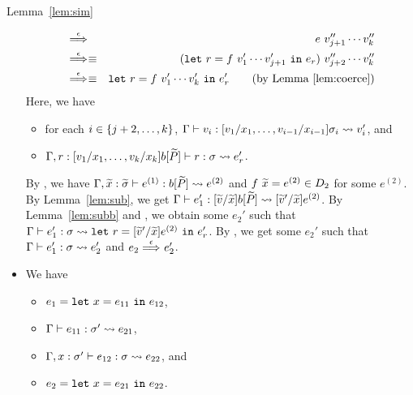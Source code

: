 \begin{pfof}{Lemma~\ref{lem:sim}}
\begin{itemize}
\begin{eqnarray*}
&\stackrel{\epsilon}{\Longrightarrow}_{}&e\ v_{j+1}''\cdots v_k'' \\
&\stackrel{\epsilon}{\Longrightarrow}_{}\equiv&(\mathtt{let~}r=f\ v_1'\cdots v_{j+1}'\mathtt{~in~}e_r)\ v_{j+2}''\cdots v_k'' \\
&\stackrel{\epsilon}{\Longrightarrow}_{}\equiv&\mathtt{let~}r=f\ v_1'\cdots v_k'\mathtt{~in~}e_r' \qquad (\mbox{by Lemma~\ref{lem:coerce}})
\end{eqnarray*}
Here, we have
\begin{itemize}
\item for each \(i \in \{j+2,\dots,k\}\), \(\Gamma \vdash v_i : [v_1/x_1,\dots,v_{i-1}/x_{i-1}]\sigma_i \leadsto v_i'\), and
\item \(\Gamma,r:[v_1/x_1,\dots,v_k/x_k]b[\widetilde{P}] \vdash r : \sigma \leadsto e_r'\).
\end{itemize}
%
By , we have
\(\Gamma,\widetilde{x}:\widetilde{\sigma} \vdash e^{(1)} : b[\widetilde{P}] \leadsto e^{(2)}\) and
\(f\ \widetilde{x}=e^{(2)} \in D_2\) for some \(e^{(2)}\).
%
By Lemma~\ref{lem:sub}, we get
\(\Gamma \vdash e_1' : [\widetilde{v}/\widetilde{x}]b[\widetilde{P}] \leadsto [\widetilde{v}'/\widetilde{x}]e^{(2)}\).
%
By Lemma~\ref{lem:subb} and , we obtain some \(e_2'\) such that
\(\Gamma \vdash e_1' : \sigma \leadsto \mathtt{let~}r=[\widetilde{v}'/\widetilde{x}]e^{(2)}\mathtt{~in~}{e_r'}\).
By , we get some \(e_2'\) such that
\(\Gamma \vdash e_1' : \sigma \leadsto e_2'\) and
\(e_2 \stackrel{\epsilon}{\Longrightarrow}_{} e_2'\).

\item[] 
We have
\begin{itemize}
\item \(e_1=\mathtt{let~}x=e_{11}\mathtt{~in~}{e_{12}}\),
\item \(\Gamma \vdash e_{11} : \sigma' \leadsto e_{21}\),
\item \(\Gamma,x:\sigma' \vdash e_{12} : \sigma \leadsto e_{22}\), and
\item \(e_2=\mathtt{let~}x=e_{21}\mathtt{~in~}{e_{22}}\).
\end{itemize}


\end{itemize}
\end{pfof}

